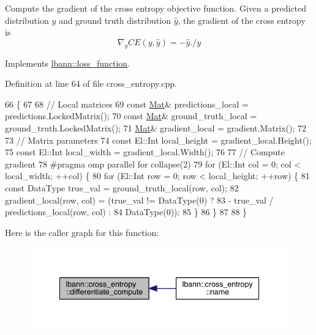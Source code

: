 Compute the gradient of the cross entropy objective function. Given a predicted distribution $y$ and ground truth distribution $\hat{y}$, the gradient of the cross entropy is \[ \nabla_y CE (y,\hat{y}) = - \hat{y} . / y \] 

Implements \hyperlink{classlbann_1_1loss__function_aefccc2b4f5a02664002d12630cf369e7}{lbann\+::loss\+\_\+function}.



Definition at line 64 of file cross\+\_\+entropy.\+cpp.


\begin{DoxyCode}
66                                                                 \{
67 
68   \textcolor{comment}{// Local matrices}
69   \textcolor{keyword}{const} \hyperlink{base_8hpp_a68f11fdc31b62516cb310831bbe54d73}{Mat}& predictions\_local = predictions.LockedMatrix();
70   \textcolor{keyword}{const} \hyperlink{base_8hpp_a68f11fdc31b62516cb310831bbe54d73}{Mat}& ground\_truth\_local = ground\_truth.LockedMatrix();
71   \hyperlink{base_8hpp_a68f11fdc31b62516cb310831bbe54d73}{Mat}& gradient\_local = gradient.Matrix();
72 
73   \textcolor{comment}{// Matrix parameters}
74   \textcolor{keyword}{const} El::Int local\_height = gradient\_local.Height();
75   \textcolor{keyword}{const} El::Int local\_width = gradient\_local.Width();
76 
77   \textcolor{comment}{// Compute gradient}
78 \textcolor{preprocessor}{  #pragma omp parallel for collapse(2)}
79   \textcolor{keywordflow}{for} (El::Int col = 0; col < local\_width; ++col) \{
80     \textcolor{keywordflow}{for} (El::Int row = 0; row < local\_height; ++row) \{
81       \textcolor{keyword}{const} DataType true\_val = ground\_truth\_local(row, col);
82       gradient\_local(row, col) = (true\_val != DataType(0) ?
83                                   - true\_val / predictions\_local(row, col) :
84                                   DataType(0));
85     \}
86   \}
87 
88 \}
\end{DoxyCode}
Here is the caller graph for this function\+:\nopagebreak
\begin{figure}[H]
\begin{center}
\leavevmode
\includegraphics[width=342pt]{classlbann_1_1cross__entropy_a5a91b6dac7d27980c47f6fd818963d1b_icgraph}
\end{center}
\end{figure}
\mbox{\label{classlbann_1_1cross__entropy_a85d6937dc70217062f7b45cb678ea1f9}} 

